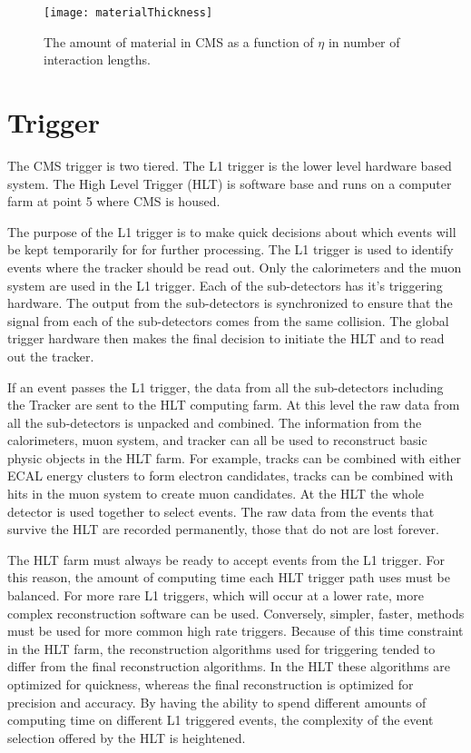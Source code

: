     \begin{figure}[!Hhbt]
      \centering
      \texttt{[image: materialThickness]}
      \caption{The amount of material in CMS as a function of $\eta$ in 
        number of interaction lengths.}
      \label{fig:matThick}
    \end{figure}
 
  \section{Trigger}
    The CMS trigger is two tiered. 
    The L1 trigger is the lower level hardware based system. 
    The High Level Trigger (HLT) is software base and runs on a computer farm
      at point 5 where CMS is housed.

    The purpose of the L1 trigger is to make quick decisions about which events
      will be kept temporarily for for further processing.
    The L1 trigger is used to identify events where the tracker should be read
      out.
    Only the calorimeters and the muon system are used in the L1 trigger.
    Each of the sub-detectors has it's triggering hardware.
    The output from the sub-detectors is synchronized to ensure that the signal
      from each of the sub-detectors comes from the same collision. 
    The global trigger hardware then makes the final decision to initiate the 
      HLT and to read out the tracker. 

    If an event passes the L1 trigger, the data from all the sub-detectors
      including the Tracker are sent to the HLT computing farm. 
    At this level the raw data from all the sub-detectors is unpacked and 
      combined.
    The information from the calorimeters, muon system, and tracker can all 
      be used to reconstruct basic physic objects in the HLT farm. 
    For example, tracks can be combined with either ECAL energy clusters to 
      form electron candidates, tracks can be combined with hits in the muon
      system to create muon candidates.
    At the HLT the whole detector is used together to select events.
    The raw data from the events that survive the HLT are recorded permanently,
      those that do not are lost forever. 

    The HLT farm must always be ready to accept events from the L1 trigger.
    For this reason, the amount of computing time each HLT trigger path uses
      must be balanced.
    For more rare L1 triggers, which will occur at a lower rate, more 
      complex reconstruction software can be used.
    Conversely, simpler, faster, methods must be used for more common high
      rate triggers. 
    Because of this time constraint in the HLT farm, the reconstruction 
      algorithms used for triggering tended to differ from the final 
      reconstruction algorithms.
    In the HLT these algorithms are optimized for quickness, whereas the final 
      reconstruction is optimized for precision and accuracy.
    By having the ability to spend different amounts of computing time on 
      different L1 triggered events, the complexity of the event selection 
      offered by the HLT is heightened. 

